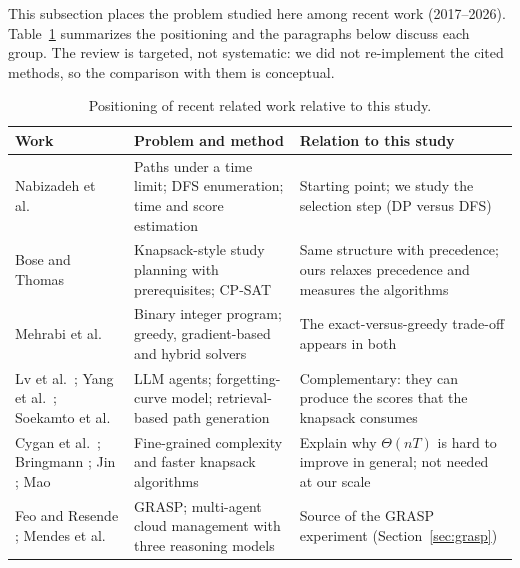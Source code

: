 This subsection places the problem studied here among recent work (2017--2026). Table~\ref{tab:related} summarizes the positioning and the paragraphs below discuss each group. The review is targeted, not systematic: we did not re-implement the cited methods, so the comparison with them is conceptual.

\begin{table}[h]
\centering
\caption{Positioning of recent related work relative to this study.}\label{tab:related}
\footnotesize
\begin{tabularx}{\linewidth}{@{}>{\raggedright\arraybackslash}p{3.7cm} >{\raggedright\arraybackslash}X >{\raggedright\arraybackslash}X@{}}
\toprule
Work & Problem and method & Relation to this study\\
\midrule
Nabizadeh et al.\ \cite{nabizadeh2017rutico,nabizadeh2019uncertainty,nabizadeh2020auxiliary} & Paths under a time limit; DFS enumeration; time and score estimation & Starting point; we study the selection step (DP versus DFS)\\
Bose and Thomas \cite{bose2026learnopt} & Knapsack-style study planning with prerequisites; CP-SAT & Same structure with precedence; ours relaxes precedence and measures the algorithms\\
Mehrabi et al.\ \cite{mehrabi2025evidence} & Binary integer program; greedy, gradient-based and hybrid solvers & The exact-versus-greedy trade-off appears in both\\
Lv et al.\ \cite{lv2025genal}; Yang et al.\ \cite{yang2026forgetting}; Soekamto et al.\ \cite{soekamto2025skyrag} & LLM agents; forgetting-curve model; retrieval-based path generation & Complementary: they can produce the scores that the knapsack consumes\\
Cygan et al.\ \cite{cygan2019minconv}; Bringmann \cite{bringmann2024small}; Jin \cite{jin2024knapsack}; Mao \cite{mao2024fptas} & Fine-grained complexity and faster knapsack algorithms & Explain why $\Theta(nT)$ is hard to improve in general; not needed at our scale\\
Feo and Resende \cite{feo1995grasp}; Mendes et al.\ \cite{mendes2022mascloud,mendes2024mascloud} & GRASP; multi-agent cloud management with three reasoning models & Source of the GRASP experiment (Section~\ref{sec:grasp})\\
\bottomrule
\end{tabularx}
\end{table}

